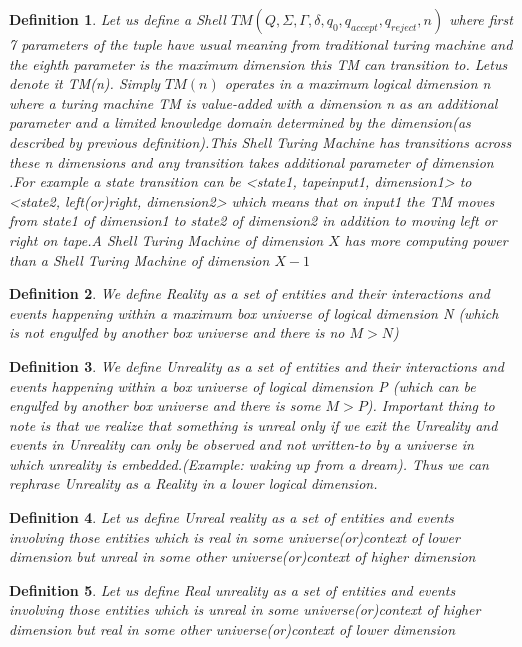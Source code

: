 \documentclass[11pt,onecolumn]{article}
\newtheorem{defn}{Definition}
\begin{document}
\begin{defn}
Let us define a Shell $TM(Q,\Sigma,\Gamma,\delta,q_{0},q_{accept},q_{reject},n)$ where first 7 parameters of the tuple have usual meaning from traditional turing machine and the eighth parameter is the maximum dimension this TM can transition to. Letus denote it TM(n). Simply $TM(n)$ operates in a maximum logical dimension n where a turing machine TM is value-added with a dimension n as an additional parameter and a limited knowledge domain determined by the dimension(as described by previous definition).This Shell Turing Machine has transitions across these n dimensions and any transition takes additional parameter of dimension .For example  a state transition can be <state1, tapeinput1, dimension1> to <state2, left(or)right, dimension2> which means that on input1 the TM moves from state1 of dimension1 to state2 of dimension2 in addition to moving left or right  on tape.A Shell Turing Machine of dimension $X$ has more computing power than a Shell Turing Machine of dimension $X-1$
\end{defn}

\begin{defn}
We define Reality as a set of entities and their interactions and events happening within a maximum box universe of logical dimension N (which is not engulfed by another box universe and there is no $M > N$)
\end{defn}

\begin{defn}
We define Unreality as a set of entities and their interactions and events happening within a box universe of logical dimension P (which can be engulfed by another box universe and there is some $M > P$). Important thing to note is that we realize that something is unreal only if we exit the Unreality and events in Unreality can only be observed and not written-to by a universe in which unreality is embedded.(Example: waking up from a dream). Thus we can rephrase Unreality as a Reality in a lower logical dimension.
\end{defn}

\begin{defn}
Let us define Unreal reality as a set of entities and events involving those entities which is real in some universe(or)context of lower dimension but unreal in some other universe(or)context of higher dimension 
\end{defn}

\begin{defn}
Let us define Real unreality as a set of entities and events involving those entities which is unreal in some universe(or)context of higher dimension but real in some other universe(or)context of lower dimension
\end{defn}
\end{document}
